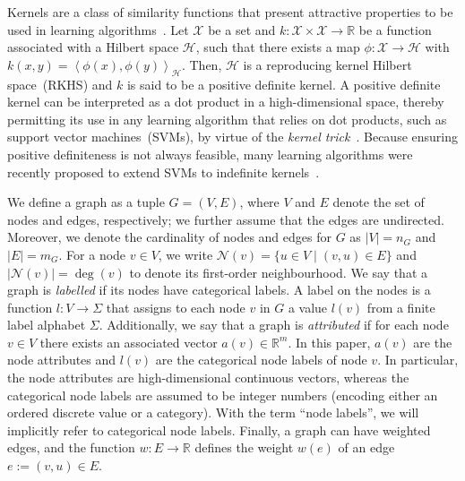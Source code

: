 \documentclass{article}
\DeclareMathOperator{\degree}{deg}
\begin{document}
Kernels are a class of similarity functions that present attractive properties to be used in learning algorithms~\citep{scholkopf2002learning}.
Let $\mathcal{X}$ be a set and $k\colon \mathcal{X} \times \mathcal{X} \to \mathbb{R}$ be a function associated with a Hilbert space $\mathcal{H}$, such that there exists a map $\phi\colon \mathcal{X} \to \mathcal{H}$ with $k(x,y) = \left \langle \phi(x), \phi(y)\right \rangle_{\mathcal{H}}$. Then, $\mathcal{H}$ is a reproducing kernel Hilbert space~(RKHS) and $k$ is said to be a positive definite kernel. 
A positive definite kernel can be interpreted as a dot product in a high-dimensional space,
thereby permitting its use in any learning algorithm that relies on dot products, such as support vector machines~(SVMs), by virtue of the \emph{kernel trick}~\citep{scholkopf2001kernel}. Because ensuring positive definiteness is not always feasible, many learning algorithms were recently proposed to extend SVMs to indefinite kernels~\citep{ong2004learning, balcan2008theory, loosli2015learning, oglic2018learning}.

We define a graph as a tuple $G = (V,E)$, where $V$ and $E$ denote the set of nodes and edges, respectively; we further assume that the edges are undirected. Moreover, we denote the cardinality of nodes and edges for $G$ as  $|V|=n_G$ and $|E| = m_G$. 
For a node $v\in V$, we write $\mathcal{N}(v) = \{u\in V \mid (v,u)\in E\}$ and $|\mathcal{N}(v)| = \degree(v)$ to denote its first-order neighbourhood. We say that a graph is \emph{labelled} if its nodes have categorical labels. A label on the nodes is a function $l\colon V\to \Sigma$ that assigns to each node $v$ in $G$ a value $l(v)$ from a finite label alphabet $\Sigma$. 
Additionally, we say that a graph is \emph{attributed} if for each node $v\in V$ there exists an associated vector $a(v)\in\mathbb{R}^{m}$. In this paper, $a(v)$ are the node attributes and $l(v)$ are the categorical node labels of node $v$. In particular, the node attributes are high-dimensional continuous vectors, whereas the categorical node labels are assumed to be integer numbers (encoding either an ordered discrete value or a category). With the term ``node labels'', we will implicitly refer to categorical node labels.
Finally, a graph can have weighted edges, and the function $w\colon E\to\mathbb{R}$ defines the weight $w(e)$ of an edge $e := (v,u) \in E$. 
\end{document}
